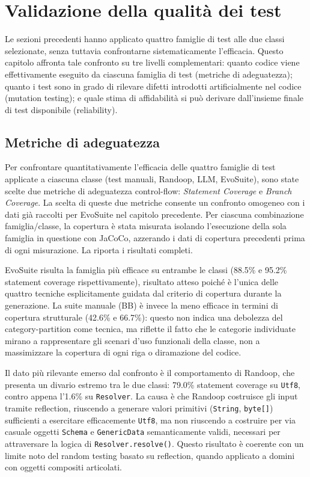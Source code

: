 \section{Validazione della qualità dei test}\label{sec:adeguatezza}

Le sezioni precedenti hanno applicato quattro famiglie di test alle
due classi selezionate, senza tuttavia confrontarne sistematicamente
l'efficacia. Questo capitolo affronta tale confronto su tre livelli
complementari: quanto codice viene effettivamente eseguito da ciascuna
famiglia di test (metriche di adeguatezza); quanto i test sono in
grado di rilevare difetti introdotti artificialmente nel codice
(mutation testing); e quale stima di affidabilità si può derivare
dall'insieme finale di test disponibile (reliability).


\subsection{Metriche di adeguatezza}

Per confrontare quantitativamente l'efficacia delle quattro famiglie
di test applicate a ciascuna classe (test manuali, Randoop, LLM,
EvoSuite), sono state scelte due metriche di adeguatezza control-flow:
\emph{Statement Coverage} e \emph{Branch Coverage}. La scelta di
queste due metriche consente un confronto omogeneo con i dati già
raccolti per EvoSuite nel capitolo precedente. Per ciascuna
combinazione famiglia/classe, la copertura è stata misurata isolando
l'esecuzione della sola famiglia in questione con JaCoCo, azzerando i
dati di copertura precedenti prima di ogni misurazione. La
 riporta i risultati completi.

EvoSuite risulta la famiglia più efficace su entrambe le classi
(88.5\% e 95.2\% statement coverage rispettivamente), risultato atteso
poiché è l'unica delle quattro tecniche esplicitamente guidata dal
criterio di copertura durante la generazione. La suite manuale (BB) è
invece la meno efficace in termini di copertura strutturale (42.6\% e
66.7\%): questo non indica una debolezza del category-partition come
tecnica, ma riflette il fatto che le categorie individuate mirano a
rappresentare gli scenari d'uso funzionali della classe, non a
massimizzare la copertura di ogni riga o diramazione del codice.

Il dato più rilevante emerso dal confronto è il comportamento di
Randoop, che presenta un divario estremo tra le due classi: 79.0\%
statement coverage su \texttt{Utf8}, contro appena l'1.6\% su
\texttt{Resolver}. La causa è che Randoop costruisce gli input tramite
reflection, riuscendo a generare valori primitivi (\texttt{String},
\texttt{byte[]}) sufficienti a esercitare efficacemente \texttt{Utf8},
ma non riuscendo a costruire per via casuale oggetti \texttt{Schema} e
\texttt{GenericData} semanticamente validi, necessari per attraversare
la logica di \texttt{Resolver.resolve()}. Questo risultato è coerente
con un limite noto del random testing basato su reflection, quando
applicato a domini con oggetti compositi articolati.

